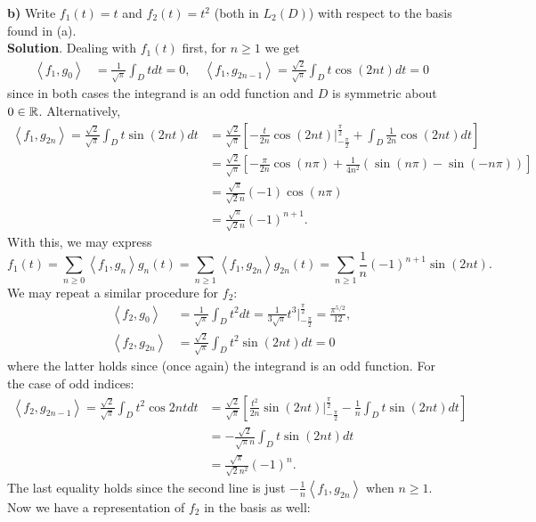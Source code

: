 \documentclass[10pt]{article}
\newcommand{\1}[1]{\mathbbm{1}_{#1}} \newcommand{\mc}[1]{\mathcal{#1}}
\newcommand{\ip}[2]{\left\langle#1,#2\right\rangle }
\begin{document}
    {\bf b)} Write $f_1(t)=t$ and $f_2(t)=t^2$ (both in $L_2(D)$) with respect to the basis found in (a).\\[5pt]
    {\bf Solution}. Dealing with $f_1(t)$ first, for $n\geq 1$ we get
    \begin{align*}
        \ip{f_1}{g_0}&=\frac{1}{\sqrt{\pi}}\int_Dtdt=0,\quad\ip{f_1}{g_{2n-1}}=\frac{\sqrt{2}}{\sqrt{\pi}}\int_Dt\cos(2nt)dt=0
    \end{align*}
    since in both cases the integrand is an odd function and $D$ is symmetric about $0\in\mathbb{R}$. Alternatively,
    \begin{align*}
        \ip{f_1}{g_{2n}}=\frac{\sqrt{2}}{\sqrt{\pi}}\int_Dt\sin(2nt)dt&=\frac{\sqrt{2}}{\sqrt{\pi}}\left[-\frac{t}{2n}\cos(2nt)\bigg|^{\frac{\pi}{2}}_{-\frac{\pi}{2}}+\int_D\frac{1}{2n}\cos(2nt)dt\right]\\
        &=\frac{\sqrt{2}}{\sqrt{\pi}}\left[-\frac{\pi}{2n}\cos(n\pi)+\frac{1}{4n^2}\left(\sin(n\pi)-\sin(-n\pi)\right)\right]\\
        &=\frac{\sqrt{\pi}}{\sqrt{2}n}(-1)\cos(n\pi)\\
        &=\frac{\sqrt{\pi}}{\sqrt{2}n}(-1)^{n+1}.
    \end{align*}
    With this, we may express
    \[f_1(t)=\sum_{n\geq 0}\ip{f_1}{g_n}g_n(t)=\sum_{n\geq 1}\ip{f_1}{g_{2n}}g_{2n}(t)=\sum_{n\geq 1}\frac{1}{n}(-1)^{n+1}\sin(2nt).\]
    We may repeat a similar procedure for $f_2$:
    \begin{align*}
        \ip{f_2}{g_0}&=\frac{1}{\sqrt{\pi}}\int_Dt^2dt=\frac{1}{3\sqrt{\pi}}t^3\bigg|^{\frac{\pi}{2}}_{-\frac{\pi}{2}}=\frac{\pi^{5/2}}{12},\\
        \ip{f_2}{g_{2n}}&=\frac{\sqrt{2}}{\sqrt{\pi}}\int_Dt^2\sin(2nt)dt=0
    \end{align*}
    where the latter holds since (once again) the integrand is an odd function. For the case of odd indices:
    \begin{align*}
        \ip{f_2}{g_{2n-1}}=\frac{\sqrt{2}}{\sqrt{\pi}}\int_Dt^2\cos{2nt}dt&=\frac{\sqrt{2}}{\sqrt{\pi}}\left[\frac{t^2}{2n}\sin(2nt)\bigg|^{\frac{\pi}{2}}_{-\frac{\pi}{2}}-\frac{1}{n}\int_Dt\sin(2nt)dt\right]\\
        &=-\frac{\sqrt{2}}{\sqrt{\pi}n}\int_Dt\sin(2nt)dt\\
        &=\frac{\sqrt{\pi}}{\sqrt{2}n^2}(-1)^n.
    \end{align*}
    The last equality holds since the second line is just $-\frac{1}{n}\ip{f_1}{g_{2n}}$ when $n\geq 1$. Now we have a representation of $f_2$ in the basis as well:
\end{document}
